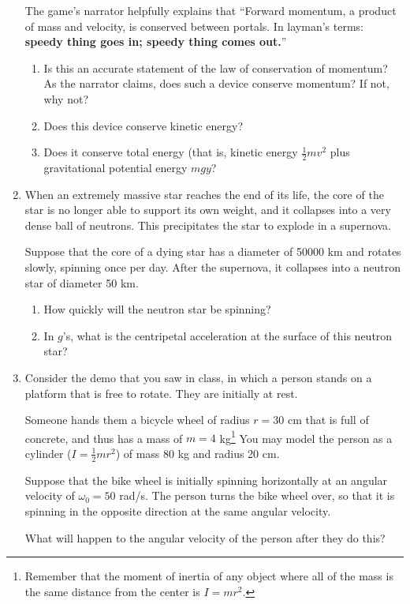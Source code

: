 \documentclass[12pt]{article}
\begin{document}
\begin{enumerate}
{The game's narrator helpfully explains that ``Forward momentum, a product of mass
and velocity, is conserved between portals. In layman's terms: {\bf speedy thing
goes in; speedy thing comes out.}''

\begin{enumerate}
\item{Is this an accurate statement of the law of conservation of momentum? As the
narrator claims, does such a device conserve momentum? If not, why not?}
\item{Does this device conserve kinetic energy?}
\item{Does it conserve total energy (that is, kinetic energy $\frac{1}{2}mv^2$
plus gravitational potential energy $mgy$?}
\end{enumerate}
}

\item{When an extremely massive star reaches the end of its life, the core of the star is no longer able to support its own weight, and it collapses into a very dense ball of neutrons. This precipitates the star to explode in a supernova.

Suppose that the core of a dying star has a diameter of 50000 km and rotates slowly, spinning once per day. After the supernova, it collapses into a neutron star of diameter 50 km. 

\begin{enumerate}
\item How quickly will the neutron star be spinning?
\item In $g$'s, what is the centripetal acceleration at the surface of this neutron star?
\end{enumerate}
}
\item Consider the demo that you saw in class, in which a person stands on a platform that is free to rotate. They are initially at rest.

Someone hands them a bicycle wheel of 
radius $r=30$ cm that is full of concrete, and thus has a mass of $m=4$ kg\footnote{Remember that the moment of inertia of any object where all of the mass is 
the same distance from the center is $I=mr^2$.} You may model the person as a cylinder ($I=\frac{1}{2}mr^2$) of mass 80 kg and radius 20 cm. 

Suppose that the bike wheel is initially spinning horizontally at an angular velocity of $\omega_0 = 50$ rad/s. The person turns the bike wheel over, so that it is
spinning in the opposite direction at the same angular velocity.

What will happen to the angular velocity of the person after they do this?


\end{enumerate}
\end{document}
